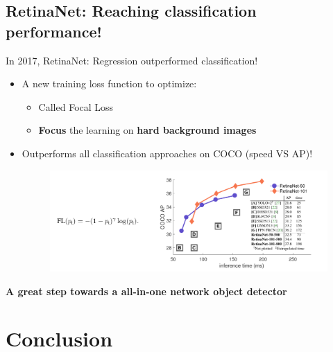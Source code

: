 \documentclass{beamer}[10pt, usepdftitle=false, handout]
\begin{document}
    \subsection{RetinaNet: Reaching classification performance!}    
    \begin{frame}

	In 2017, RetinaNet: Regression outperformed classification!	
	
	\vspace*{0.5em}
	
	\begin{itemize}
		\item{A new training loss function to optimize:
			\begin{itemize}
				\item{Called Focal Loss}
				\item{\textbf{Focus} the learning on \textbf{hard background images}}
			\end{itemize}					
		}	
		\item{Outperforms all classification approaches on COCO (speed VS AP)!
			\begin{figure}
				\includegraphics[scale=0.45]{39.png} 
				\end{figure}		
		}
		
	\end{itemize}		
	\vspace*{0.5em}
	
	\textbf{A great step towards a all-in-one network object detector}	
	
    \end{frame} 
    
    \section{Conclusion}   
    
	  
    
\end{document}
